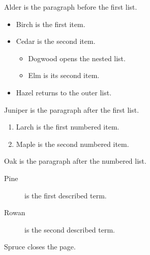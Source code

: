 \documentclass{article}
\begin{document}
Alder is the paragraph before the first list.
\begin{itemize}
\item Birch is the first item.
\item Cedar is the second item.
  \begin{itemize}
  \item Dogwood opens the nested list.
  \item Elm is its second item.
  \end{itemize}
\item Hazel returns to the outer list.
\end{itemize}
Juniper is the paragraph after the first list.
\begin{enumerate}
\item Larch is the first numbered item.
\item Maple is the second numbered item.
\end{enumerate}
Oak is the paragraph after the numbered list.
\begin{description}
\item[Pine] is the first described term.
\item[Rowan] is the second described term.
\end{description}
Spruce closes the page.
\end{document}
